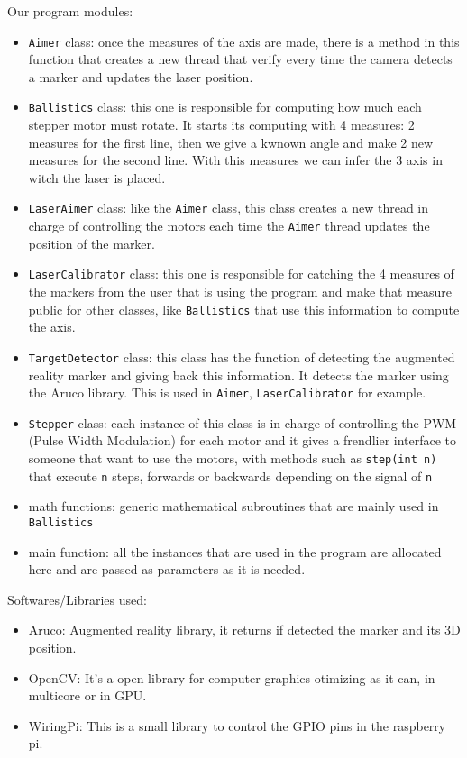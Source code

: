 \documentclass{article}
\newcommand\class[1]{\texttt{#1}}
\newcommand\method[1]{\texttt{#1}}
\begin{document}
Our program modules:
\begin{itemize}
    \item \class{Aimer} class: once the measures of the axis are made,
there is a method in this function that creates a new thread that verify
every time the camera detects a marker and updates the laser position.
    \item \class{Ballistics} class: this one is responsible for computing
how much each stepper motor must rotate. It starts its computing with
4 measures: 2 measures for the first line, then we give a kwnown angle and
make 2 new measures for the second line. With this measures we can infer 
the 3 axis in witch the laser is placed.
    \item \class{LaserAimer} class: like the \class{Aimer} class, this class
creates a new thread in charge of controlling the motors each time the 
\class{Aimer} thread updates the position of the marker.
    \item \class{LaserCalibrator} class: this one is responsible for catching
the 4 measures of the markers from the user that is using the program and make
that measure public for other classes, like \class{Ballistics} that use this
information to compute the axis.
    \item \class{TargetDetector} class: this class has the function of
detecting the augmented reality marker and giving back this information.
It detects the marker using the Aruco library.
This is used in \class{Aimer}, \class{LaserCalibrator} for example.
    \item \class{Stepper} class: each instance of this class is in charge of
controlling the PWM (Pulse Width Modulation) for each motor and it
gives a frendlier interface to someone that want to use the motors,
with methods such as \method{step(int n)} that execute \texttt{n} steps,
forwards or backwards depending on the signal of \texttt{n}
    \item math functions: generic mathematical subroutines that are mainly used in
\class{Ballistics} 
    \item main function: all the instances that are used in the program are
allocated here and are passed as parameters as it is needed. 
\end{itemize}

Softwares/Libraries used:
\begin{itemize}
    \item Aruco: Augmented reality library, it returns if detected the marker
and its 3D position.
    \item OpenCV: It's a open library for computer graphics otimizing as it can,
in multicore or in GPU. 
    \item WiringPi: This is a small library to control the GPIO pins in the
raspberry pi.
\end{itemize}
\end{document}
